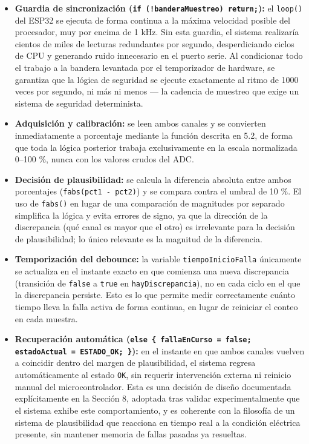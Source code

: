 \documentclass[12pt, letterpaper]{article}
\begin{document}
	\begin{itemize}
		\item \textbf{Guardia de sincronización (\texttt{if (!banderaMuestreo) return;}):} el \texttt{loop()} del ESP32 se ejecuta de forma continua a la máxima velocidad posible del procesador, muy por encima de 1 kHz. Sin esta guardia, el sistema realizaría cientos de miles de lecturas redundantes por segundo, desperdiciando ciclos de CPU y generando ruido innecesario en el puerto serie. Al condicionar todo el trabajo a la bandera levantada por el temporizador de hardware, se garantiza que la lógica de seguridad se ejecute exactamente al ritmo de 1000 veces por segundo, ni más ni menos — la cadencia de muestreo que exige un sistema de seguridad determinista.
		\item \textbf{Adquisición y calibración:} se leen ambos canales y se convierten inmediatamente a porcentaje mediante la función descrita en 5.2, de forma que toda la lógica posterior trabaja exclusivamente en la escala normalizada 0--100 \%, nunca con los valores crudos del ADC.
		\item \textbf{Decisión de plausibilidad:} se calcula la diferencia absoluta entre ambos porcentajes (\texttt{fabs(pct1 - pct2)}) y se compara contra el umbral de 10 \%. El uso de \texttt{fabs()} en lugar de una comparación de magnitudes por separado simplifica la lógica y evita errores de signo, ya que la dirección de la discrepancia (qué canal es mayor que el otro) es irrelevante para la decisión de plausibilidad; lo único relevante es la magnitud de la diferencia.
		\item \textbf{Temporización del debounce:} la variable \texttt{tiempoInicioFalla} únicamente se actualiza en el instante exacto en que comienza una nueva discrepancia (transición de \texttt{false} a \texttt{true} en \texttt{hayDiscrepancia}), no en cada ciclo en el que la discrepancia persiste. Esto es lo que permite medir correctamente cuánto tiempo lleva la falla activa de forma continua, en lugar de reiniciar el conteo en cada muestra.
		\item \textbf{Recuperación automática (\texttt{else \{ fallaEnCurso = false; estadoActual = ESTADO\_OK; \}}):} en el instante en que ambos canales vuelven a coincidir dentro del margen de plausibilidad, el sistema regresa automáticamente al estado \texttt{OK}, sin requerir intervención externa ni reinicio manual del microcontrolador. Esta es una decisión de diseño documentada explícitamente en la Sección 8, adoptada tras validar experimentalmente que el sistema exhibe este comportamiento, y es coherente con la filosofía de un sistema de plausibilidad que reacciona en tiempo real a la condición eléctrica presente, sin mantener memoria de fallas pasadas ya resueltas.

\end{itemize}
\end{document}
